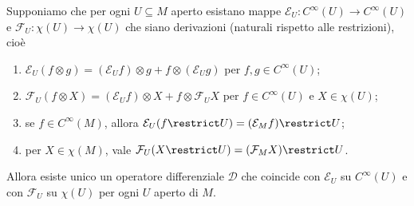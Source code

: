 \begin{theorem} \label{thm:EsistenzaOperatoriDifferenziali}
	Supponiamo che per ogni $U\subseteq M$ aperto esistano mappe $\mathcal E_U : C^\infty(U) \to C^\infty(U)$ e $\mathcal F_U : \chi(U) \to \chi(U)$ che siano derivazioni (naturali rispetto alle restrizioni), cioè
	\begin{enumerate}
		\item $\mathcal E_U(f\otimes g) = (\mathcal E_U f) \otimes g + f \otimes (\mathcal E_U g)$ per $f,g\in C^\infty(U)$; \label{eod:LeibnitzPerE}
		\item $\mathcal F_U(f\otimes X) = (\mathcal E_U f) \otimes X + f\otimes \mathcal F_U X$ per $f\in C^\infty(U)$ e $X\in\chi(U)$; \label{eod:LeibnitzPerF}
		\item se $f\in C^\infty(M)$, allora $\mathcal E_U(f\restrict U) = (\mathcal E_M f)\restrict U$; \label{eod:LocalitaPerE}
		\item per $X\in\chi(M)$, vale $\mathcal F_U(X\restrict U) = (\mathcal F_M X)\restrict U$. \label{eod:LocalitaPerF}
	\end{enumerate}
	Allora esiste unico un operatore differenziale $\mathcal D$ che coincide con $\mathcal E_U$ su $C^\infty(U)$ e con $\mathcal F_U$ su $\chi(U)$ per ogni $U$ aperto di $M$.

\end{theorem}


